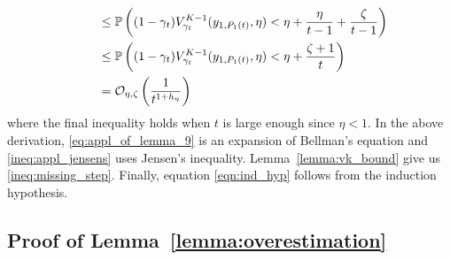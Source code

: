 \begin{myproof}[Proof.]
\begin{align}
	& \qquad \le \mathbb{P} \left(  (1-\gamma_t)V^{K-1}_{\gamma_{t}}(y_{1,P_{1}(t)}, \eta)< \eta + \frac{\eta}{t-1} +  \frac{\zeta}{t-1} \right) \nonumber \\
	& \qquad \le \mathbb{P} \left(  (1-\gamma_t)V^{K-1}_{\gamma_{t}}(y_{1,P_{1}(t)}, \eta)< \eta +   \frac{\zeta + 1}{t} \right) \nonumber \\
	&\qquad =  \mathcal{O}_{\eta,\zeta}\left(\frac{1}{t^{1 + h_\eta}}\right) \label{eqn:ind_hyp}
	\end{align}
	where the final inequality holds when $t$ is large enough since $\eta < 1$. In the above derivation, \eqref{eq:appl_of_lemma_9} is an expansion of Bellman's equation and \eqref{ineq:appl_jensens} uses Jensen's inequality. 
	Lemma~\ref{lemma:vk_bound} give us \eqref{ineq:missing_step}. %
	Finally, equation \eqref{eqn:ind_hyp} follows from the induction hypothesis.
\end{myproof}

\subsection{Proof of Lemma~\ref{lemma:overestimation}} \label{proof:overestimation_proof}

